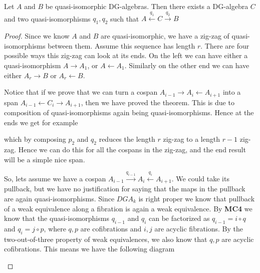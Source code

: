 \begin{theorem}
\label{thm:span}
Let $A$ and $B$ be quasi-isomorphic DG-algebras. Then there exists a DG-algebra $C$ and two quasi-isomorphisms $q_1, q_2$ such that $A\overset{q_1}\longleftarrow C \overset{q_2}\longrightarrow B$
\end{theorem}
\begin{proof}
Since we know $A$ and $B$ are quasi-isomorphic, we have a zig-zag of quasi-isomorphisms between them. Assume this sequence has length $r$. There are four possible ways this zig-zag can look at its ends. On the left we can have either a quasi-isomorphism $A\longrightarrow A_1$, or $A\longleftarrow A_1$. Similarly on the other end we can have either $A_r\longrightarrow B$ or $A_r\longleftarrow B$. 

Notice that if we prove that we can turn a cospan $A_{i-1}\longrightarrow A_i\longleftarrow A_{i+1}$ into a span $A_{i-1}\longleftarrow C_i \longrightarrow A_{i+1}$, then we have proved the theorem. This is due to composition of quasi-isomorphisms again being quasi-isomorphisms. Hence at the ends we get for example
\begin{center}
\end{center}
which by composing $p_2$ and $q_2$ reduces the length $r$ zig-zag to a length $r-1$ zig-zag. Hence we can do this for all the cospans in the zig-zag, and the end result will be a simple nice span. 

So, lets assume we have a cospan $A_{i-1}\overset{q_{i-1}}\longrightarrow A_i\overset{q_i}\longleftarrow A_{i+1}$. We could take its pullback, but we have no justification for saying that the maps in the pullback are again quasi-isomorphisms. Since $DGA_k$ is right proper we know that pullback of a weak equivalence along a fibration is again a weak equivalence. By \textbf{MC4} we know that the quasi-isomorphisms $q_{i-1}$ and $q_i$ can be factorized as $q_{i-1} = i \circ q$ and $q_i = j\circ p$, where $q, p$ are cofibrations and $i, j$ are acyclic fibrations. By the two-out-of-three property of weak equivalences, we also know that $q, p$ are acyclic cofibrations. This means we have the following diagram
\begin{center}
\end{center}
\end{proof}
